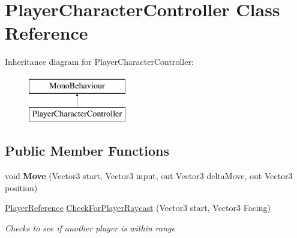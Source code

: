 \hypertarget{class_player_character_controller}{\section{Player\-Character\-Controller Class Reference}
\label{class_player_character_controller}
}
Inheritance diagram for Player\-Character\-Controller\-:\begin{figure}[H]
\begin{center}
\leavevmode
\includegraphics[height=2.000000cm]{class_player_character_controller}
\end{center}
\end{figure}
\subsection*{Public Member Functions}
\begin{DoxyCompactItemize}
\item 
\hypertarget{class_player_character_controller_afa2260da91d3f72d414e192353d89646}{void {\bfseries Move} (Vector3 start, Vector3 input, out Vector3 delta\-Move, out Vector3 position)}\label{class_player_character_controller_afa2260da91d3f72d414e192353d89646}

\item 
\hyperlink{class_player_reference}{Player\-Reference} \hyperlink{class_player_character_controller_a56ccebf53cda9dd2ae25b09f728f628b}{Check\-For\-Player\-Raycast} (Vector3 start, Vector3 Facing)
\begin{DoxyCompactList}\small\item\em Checks to see if another player is within range \end{DoxyCompactList}\end{DoxyCompactItemize}

